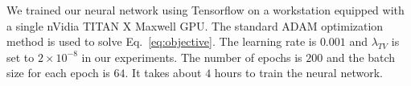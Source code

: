 
We trained our neural network using Tensorflow on a workstation equipped with a
single nVidia TITAN X Maxwell GPU. The standard ADAM
optimization method \cite{kingma2014adam} is used to solve
Eq.~\ref{eq:objective}. The learning rate is $0.001$ and $\lambda_{TV}$ is set to
$2\times10^{-8}$ in our experiments. The number of epochs is $200$ and the batch size for each
epoch is $64$. It takes about $4$ hours to train the neural network.
